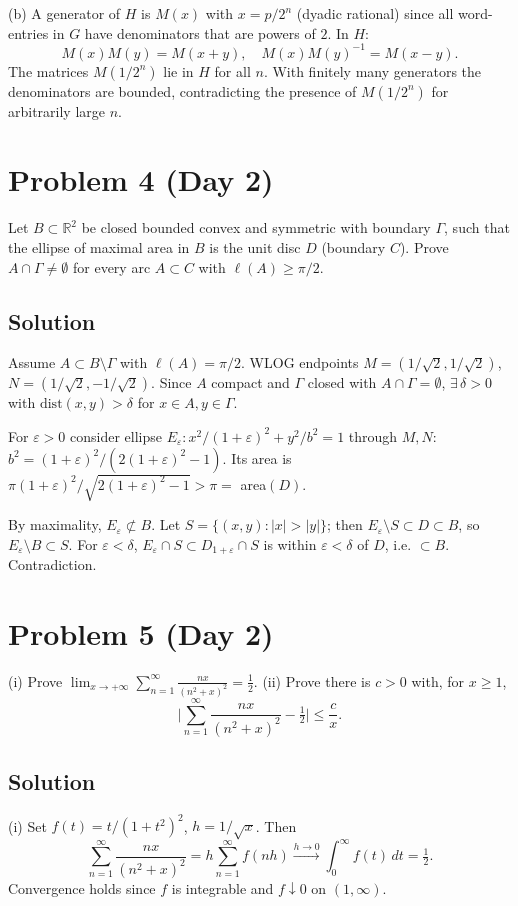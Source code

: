 \documentclass{article}
\begin{document}
(b) A generator of $H$ is $M(x)$ with $x = p/2^n$ (dyadic rational) since all word-entries in $G$ have denominators that are powers of $2$. In $H$:
\[
M(x)M(y) = M(x+y), \quad M(x)M(y)^{-1} = M(x-y).
\]
The matrices $M(1/2^n)$ lie in $H$ for all $n$. With finitely many generators the denominators are bounded, contradicting the presence of $M(1/2^n)$ for arbitrarily large $n$.

\section*{Problem 4 (Day 2)}
Let $B \subset \mathbb{R}^2$ be closed bounded convex and symmetric with boundary $\Gamma$, such that the ellipse of maximal area in $B$ is the unit disc $D$ (boundary $C$). Prove $A \cap \Gamma \neq \emptyset$ for every arc $A \subset C$ with $\ell(A) \geq \pi/2$.

\subsection*{Solution}
Assume $A \subset B\setminus\Gamma$ with $\ell(A) = \pi/2$. WLOG endpoints $M = (1/\sqrt 2, 1/\sqrt 2)$, $N = (1/\sqrt 2, -1/\sqrt 2)$. Since $A$ compact and $\Gamma$ closed with $A\cap\Gamma=\emptyset$, $\exists\,\delta>0$ with $\mathrm{dist}(x,y) > \delta$ for $x\in A, y\in\Gamma$.

For $\varepsilon > 0$ consider ellipse $E_\varepsilon: x^2/(1+\varepsilon)^2 + y^2/b^2 = 1$ through $M, N$: $b^2 = (1+\varepsilon)^2 / (2(1+\varepsilon)^2 - 1)$. Its area is $\pi(1+\varepsilon)^2/\sqrt{2(1+\varepsilon)^2-1} > \pi = $ area$(D)$.

By maximality, $E_\varepsilon \not\subset B$. Let $S = \{(x,y): |x| > |y|\}$; then $E_\varepsilon \setminus S \subset D \subset B$, so $E_\varepsilon \setminus B \subset S$. For $\varepsilon < \delta$, $E_\varepsilon \cap S \subset D_{1+\varepsilon} \cap S$ is within $\varepsilon < \delta$ of $D$, i.e. $\subset B$. Contradiction.

\section*{Problem 5 (Day 2)}
(i) Prove $\lim_{x\to+\infty} \sum_{n=1}^\infty \frac{nx}{(n^2+x)^2} = \frac{1}{2}$.
(ii) Prove there is $c>0$ with, for $x \geq 1$,
\[
\Big|\sum_{n=1}^\infty \frac{nx}{(n^2+x)^2} - \tfrac{1}{2}\Big| \leq \frac{c}{x}.
\]

\subsection*{Solution}
(i) Set $f(t) = t/(1+t^2)^2$, $h = 1/\sqrt{x}$. Then
\[
\sum_{n=1}^\infty \frac{nx}{(n^2+x)^2} = h\sum_{n=1}^\infty f(nh) \xrightarrow{h\to 0} \int_0^\infty f(t)\,dt = \tfrac{1}{2}.
\]
Convergence holds since $f$ is integrable and $f\downarrow 0$ on $(1,\infty)$.
\end{document}
